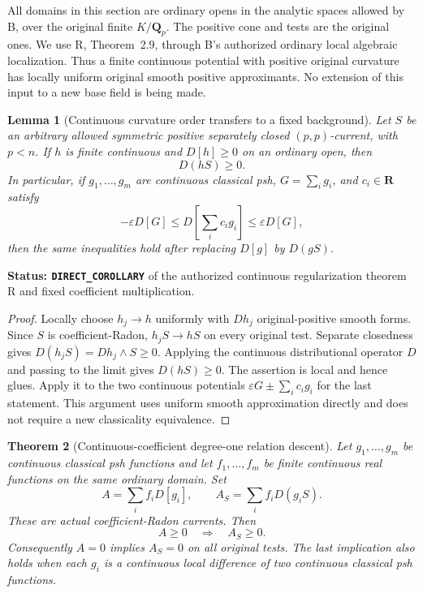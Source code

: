 \documentclass[11pt,a4paper]{article}
\numberwithin{equation}{section}
\newtheorem{theorem}{Theorem}[section]
\newtheorem{lemma}[theorem]{Lemma}
\theoremstyle{definition}
\theoremstyle{remark}
\begin{document}
All domains in this section are ordinary opens in the analytic
spaces allowed by B, over the original finite $K/\mathbf Q_p$.
The positive cone and tests are the original ones.  We use R,
Theorem~2.9, through B's authorized ordinary local algebraic
localization.  Thus a finite continuous potential with positive
original curvature has locally uniform original smooth positive
approximants.  No extension of this input to a new base field is
being made.

\begin{lemma}[Continuous curvature order transfers to a fixed background]
\label{lem:r6-continuous-curvature-order}
Let $S$ be an arbitrary allowed symmetric positive separately closed
$(p,p)$-current, with $p<n$.  If $h$ is finite continuous and
$D[h]\geq0$ on an ordinary open, then
\[
                              D(hS)\geq0.
\]
In particular, if $g_1,\ldots,g_m$ are continuous classical psh,
$G=\sum_i g_i$, and $c_i\in\mathbf R$ satisfy
\[
       -\varepsilon D[G]\leq D\left[\sum_i c_i g_i\right]
                                    \leq\varepsilon D[G],
\]
then the same inequalities hold after replacing $D[g]$ by $D(gS)$.
\end{lemma}

\noindent\textbf{Status: \texttt{DIRECT\_COROLLARY}} of the
authorized continuous regularization theorem R and fixed coefficient
multiplication.

\begin{proof}
Locally choose $h_j\to h$ uniformly with $Dh_j$ original-positive
smooth forms.  Since $S$ is coefficient-Radon, $h_jS\to hS$ on
every original test.  Separate closedness gives
$D(h_jS)=Dh_j\wedge S\geq0$.  Applying the continuous distributional
operator $D$ and passing to the limit gives $D(hS)\geq0$.
The assertion is local and hence glues.  Apply it to the two
continuous potentials $\varepsilon G\pm\sum_i c_i g_i$ for the
last statement.  This argument uses uniform smooth approximation
directly and does not require a new classicality equivalence.
\end{proof}

\begin{theorem}[Continuous-coefficient degree-one relation descent]
\label{thm:r6-continuous-curvature-module}
Let $g_1,\ldots,g_m$ be continuous classical psh functions and let
$f_1,\ldots,f_m$ be finite continuous real functions on the same
ordinary domain.  Set
\[
                  A=\sum_i f_iD[g_i],\qquad
                  A_S=\sum_i f_iD(g_iS).
\]
These are actual coefficient-Radon currents.  Then
\[
                       A\geq0\quad\Longrightarrow\quad A_S\geq0.
\]
Consequently $A=0$ implies $A_S=0$ on all original tests.
The last implication also holds when each $g_i$ is a continuous
local difference of two continuous classical psh functions.
\end{theorem}
\end{document}
